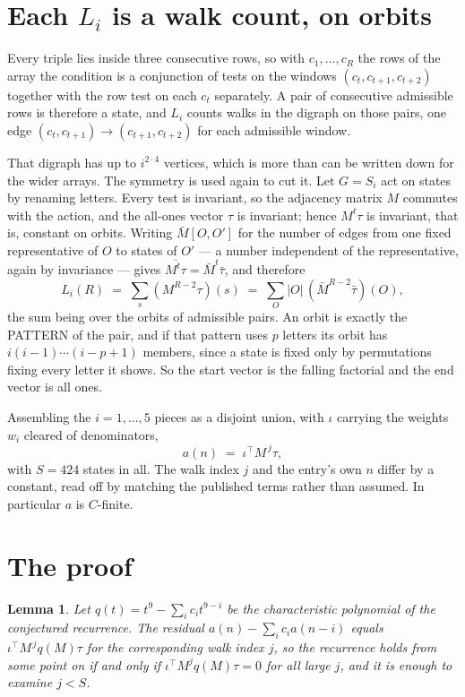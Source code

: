 \documentclass[11pt,a4paper]{article}
\theoremstyle{plain}
\newtheorem{lemma}[theorem]{Lemma}
\theoremstyle{definition}
\begin{document}
\section{Each $L_i$ is a walk count, on orbits}

Every triple lies inside three consecutive rows, so with $c_1,\dots,c_R$ the rows of the array
the condition is a conjunction of tests on the windows $(c_{t},c_{t+1},c_{t+2})$ together
with the row test on each $c_t$ separately. A pair of consecutive admissible rows is therefore
a state, and $L_i$ counts walks in the digraph on those pairs, one edge $(c_t,c_{t+1})\to
(c_{t+1},c_{t+2})$ for each admissible window.

That digraph has up to $i^{2\cdot4}$ vertices, which is more than can be written down for
the wider arrays. The symmetry is used again to cut it. Let $G=S_i$ act on states by renaming
letters. Every test is invariant, so the adjacency matrix $M$ commutes with the action, and the
all-ones vector $\tau$ is invariant; hence $M^{t}\tau$ is invariant, that is, constant on
orbits. Writing $\bar M[O,O']$ for the number of edges from one fixed representative of $O$ to
states of $O'$ --- a number independent of the representative, again by invariance --- gives
$\overline{M^{t}\tau}=\bar M^{t}\bar\tau$, and therefore
\[
L_i(R)\;=\;\sum_{s}(M^{R-2}\tau)(s)\;=\;\sum_{O}|O|\,(\bar M^{R-2}\bar\tau)(O),
\]
the sum being over the orbits of admissible pairs. An orbit is exactly the PATTERN of the pair,
and if that pattern uses $p$ letters its orbit has $i(i-1)\cdots(i-p+1)$ members, since a state
is fixed only by permutations fixing every letter it shows. So the start vector is the falling
factorial and the end vector is all ones.

Assembling the $i=1,\dots,5$ pieces as a disjoint union, with $\iota$ carrying the weights
$w_i$ cleared of denominators,
\[
a(n)\;=\;\iota^{\!\top}M^{\,j}\tau ,
\]
with $S=424$ states in all. The walk index $j$ and the entry's own $n$ differ by a constant,
read off by matching the published terms rather than assumed. In particular $a$ is $C$-finite.

\section{The proof}

\begin{lemma}\label{lem:crit}
Let $q(t)=t^{9}-\sum_i c_it^{9-i}$ be the characteristic polynomial of the
conjectured recurrence. The residual $a(n)-\sum_ic_ia(n-i)$ equals
$\iota^{\!\top}M^{\,j}q(M)\tau$ for the corresponding walk index $j$, so the recurrence
holds from some point on if and only if $\iota^{\!\top}M^{j}q(M)\tau=0$ for all large $j$,
and it is enough to examine $j<S$.
\end{lemma}
\end{document}
